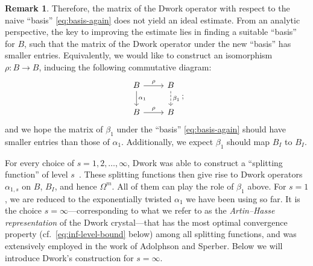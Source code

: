 \documentclass{amsart}
\numberwithin{equation}{section}
\theoremstyle{plain}
\theoremstyle{definition}
\newtheorem{remark}[equation]{Remark}
\renewcommand{\mathbb}{\mathbf}
\begin{document}
\begin{remark}

Therefore, the matrix of the Dwork operator with respect to the naive
``basis'' \eqref{eq:basis-again} does not yield an ideal estimate.
From an analytic perspective, the key to improving the estimate lies
in finding a suitable ``basis'' for \(B\), such that the matrix of the
Dwork operator under the new ``basis'' has smaller entries.
Equivalently, we would like to construct an isomorphism
\(\rho\colon B \to B\), inducing the following commutative diagram:
\[
\begin{tikzcd}
B \ar{r}{\rho} \ar{d}{\alpha_{1}} & B \ar[dashed]{d}{\beta_{1}} \\
B \ar{r}{\rho} & B
\end{tikzcd};
\]
and we hope the matrix of \(\beta_{1}\) under the ``basis''
\eqref{eq:basis-again} should have smaller entries than those of
\(\alpha_{1}\).  Additionally, we expect \(\beta_{1}\) should map
\(B_{I}\) to \(B_{I}\).

\medskip%
For every choice of \(s=1,2,\ldots,\infty\), Dwork was able to
construct a ``splitting function'' of level
\(s\)~\cite[Eq.~(4.1)]{dwork:zeta-function-hypersurface-1}.  These
splitting functions then give rise to Dwork operators \(\alpha_{1,s}\)
on \(B\), \(B_{I}\), and hence \(\Omega^{m}\).  All of them can play
the role of \(\beta_{1}\) above.  For \(s=1\), we are reduced to the
exponentially twisted \(\alpha_{1}\) we have been using so far.  It is
the choice \(s = \infty\)---corresponding to what we refer to as the
\emph{Artin--Hasse representation} of the Dwork crystal---that has the
most optimal convergence property (cf.~\eqref{eq:inf-level-bound}
below) among all splitting functions, and was extensively employed in
the work of Adolphson and Sperber.  Below we will introduce Dwork's
construction for \(s=\infty\).
\end{remark}
\end{document}
